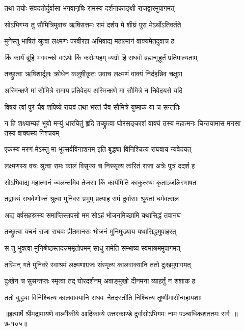 
\twolineshloka
{तथा तयोः संवदतोर्दुर्वासा भगवानृषिः}
{रामस्य दर्शनाकाङ्क्षी राजद्वारमुपागमत्} %

\twolineshloka
{सोऽभिगम्य तु सौमित्रिमुवाच ऋषिसत्तमः}
{रामं दर्शय मे शीघ्रं पुरा मेऽर्थोऽतिवर्तते} %

\twolineshloka
{मुनेस्तु भाषितं श्रुत्वा लक्ष्मणः परवीरहा}
{अभिवाद्य महात्मानं वाक्यमेतदुवाच ह} %

\twolineshloka
{किं कार्यं ब्रूहि भगवन्को वाऽर्थः किं करोम्यहम्}
{व्यग्रो हि राघवो ब्रह्मन्मुहूर्तं प्रतिपाल्यताम्} %

\twolineshloka
{तच्छ्रुत्वा ऋषिशार्दूलः क्रोधेन कलुषीकृतः}
{उवाच लक्ष्मणं वाक्यं निर्दहन्निव चक्षुषा} %

\twolineshloka
{अस्मिन्क्षणे मां सौमित्रे रामाय प्रतिवेदय}
{अस्मिन्क्षणे मां सौमित्रे न निवेदयसे यदि} %

\twolineshloka
{विषयं त्वां पुरं चैव शपिष्ये राघवं तथा}
{भरतं चैव सौमित्रे युष्माकं या च सन्ततिः} %

\threelineshloka
{न हि शक्ष्याम्यहं भूयो मन्युं धारयितुं हृदि}
{तच्छ्रुत्वा घोरसङ्काशं वाक्यं तस्य महात्मनः}
{चिन्तयामास मनसा तस्य वाक्यस्य निश्चयम्} %

\twolineshloka
{एकस्य मरणं मेऽस्तु मा भूत्सर्वविनाशनम्}
{इति बुद्ध्या विनिश्चित्य राघवाय न्यवेदयत्} %

\twolineshloka
{लक्ष्मणस्य वचः श्रुत्वा रामः कालं विसृज्य च}
{निस्सृत्य त्वरितं राजा अत्रेः पुत्रं ददर्श ह} %

\twolineshloka
{सोऽभिवाद्य महात्मानं ज्वलन्तमिव तेजसा}
{किं कार्यमिति काकुत्स्थः कृताञ्जलिरभाषत} %

\twolineshloka
{तद्वाक्यं राघवेणोक्तं श्रुत्वा मुनिवरः प्रभुम्}
{प्रत्याह रामं दुर्वासाः श्रूयतां धर्मवत्सल} %

\twolineshloka
{अद्य वर्षसहस्रस्य समाप्तिस्तपसो मम}
{सोऽहं भोजनमिच्छामि यथासिद्धं तवानघ} %

\twolineshloka
{तच्छ्रुत्वा वचनं राजा राघवः प्रीतमानसः}
{भोजनं मुनिमुख्याय यथासिद्धमुपाहरत्} %

\twolineshloka
{स तु भुक्त्वा मुनिश्रेष्ठस्तदन्नममृतोपमम्}
{साधु रामेति सम्भाष्य स्वमाश्रममुपागमत्} %

\twolineshloka
{तस्मिन् गते मुनिवरे स्वाश्रमं लक्ष्मणाग्रजः}
{संस्मृत्य कालवाक्यानि ततो दुःखमुपागमत्} %

\twolineshloka
{दुःखेन च सुसन्तप्तः स्मृत्वा तद् घोरदर्शनम्}
{अवाङ्मुखो दीनमना व्याहर्तुं न शशाक ह} %

\twolineshloka
{ततो बुद्ध्या विनिश्चित्य कालवाक्यानि राघवः}
{नैतदस्तीति निश्चित्य तूष्णीमासीन्महायशाः} %


॥इत्यार्षे श्रीमद्रामायणे वाल्मीकीये आदिकाव्ये उत्तरकाण्डे दुर्वासोऽभिगमः नाम पञ्चाधिकशततमः सर्गः ॥७-१०५॥
